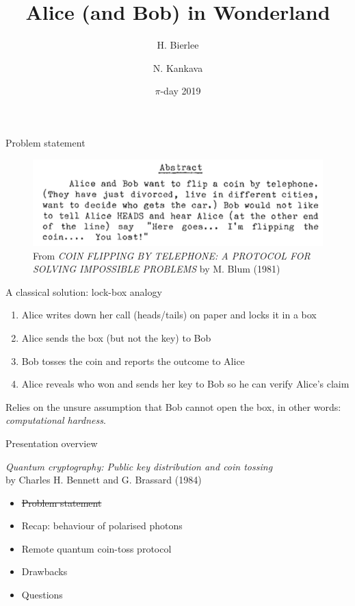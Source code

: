 \documentclass{beamer}
\title{Alice (and Bob) in Wonderland}
\author{H. Bierlee \and N. Kankava}
\institute{Uppsala University}
\date{$\pi$-day 2019}
\begin{document}
\frame{\titlepage}

\begin{frame}{Problem statement}

\begin{figure}
    \centering
    \includegraphics{blum-abstract}
    \caption{From \emph{COIN FLIPPING BY TELEPHONE: A PROTOCOL FOR SOLVING IMPOSSIBLE PROBLEMS} by M. Blum (1981)}
    \label{fig:blum-abstract}
\end{figure}

\end{frame}

\begin{frame}{A classical solution: lock-box analogy}

\begin{enumerate}
    \item Alice writes down her call (heads/tails) on paper and locks it in a box
    \item Alice sends the box (but not the key) to Bob
    \item Bob tosses the coin and reports the outcome to Alice
    \item Alice reveals who won and sends her key to Bob so he can verify Alice's claim
\end{enumerate}

Relies on the unsure assumption that Bob cannot open the box, in other words: \emph{computational hardness}.

\end{frame}

\begin{frame}{Presentation overview}

\emph{Quantum cryptography:
Public key distribution and coin tossing}\\
\quad by Charles H. Bennett and G. Brassard (1984)
\vfill

\begin{itemize}
    \item \sout{Problem statement}
    \vfill
    \item Recap: behaviour of polarised photons
    \vfill
    \item Remote quantum coin-toss protocol
    \vfill
    \item Drawbacks
    \vfill
    \item Questions
    \vfill
\end{itemize}
\vfill

\end{frame}
\end{document}
